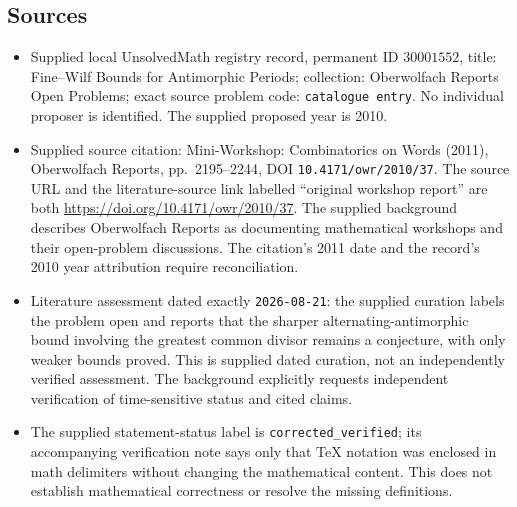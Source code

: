 \documentclass[11pt]{article}
\begin{document}
\subsection{Sources}
\begin{itemize}
\item Supplied local UnsolvedMath registry record, permanent ID \(30001552\), title: Fine--Wilf Bounds for Antimorphic Periods; collection: Oberwolfach Reports Open Problems; exact source problem code: \texttt{catalogue entry}. No individual proposer is identified. The supplied proposed year is 2010.
\item Supplied source citation: Mini-Workshop: Combinatorics on Words (2011), Oberwolfach Reports, pp.\ 2195--2244, DOI \texttt{10.4171/owr/2010/37}. The source URL and the literature-source link labelled ``original workshop report'' are both \url{https://doi.org/10.4171/owr/2010/37}. The supplied background describes Oberwolfach Reports as documenting mathematical workshops and their open-problem discussions. The citation's 2011 date and the record's 2010 year attribution require reconciliation.
\item Literature assessment dated exactly \texttt{2026-08-21}: the supplied curation labels the problem open and reports that the sharper alternating-antimorphic bound involving the greatest common divisor remains a conjecture, with only weaker bounds proved. This is supplied dated curation, not an independently verified assessment. The background explicitly requests independent verification of time-sensitive status and cited claims.
\item The supplied statement-status label is \texttt{corrected\_verified}; its accompanying verification note says only that TeX notation was enclosed in math delimiters without changing the mathematical content. This does not establish mathematical correctness or resolve the missing definitions.
\end{itemize}
\end{document}
